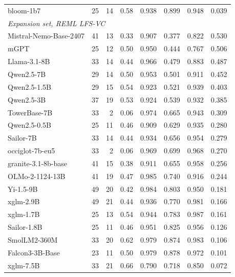 \documentclass{article} %
\begin{document}
\begin{table}[h]
\begin{center}
\begin{tabular}{lrrrrrrr}
bloom-1b7 & 25 & 14 & 0.58 & 0.938 & 0.899 & 0.948 & 0.039 \\
\multicolumn{8}{l}{\emph{Expansion set, REML LFS-VC}} \\
Mistral-Nemo-Base-2407 & 41 & 13 & 0.33 & 0.907 & 0.377 & 0.822 & 0.530 \\
mGPT & 25 & 12 & 0.50 & 0.950 & 0.444 & 0.767 & 0.506 \\
Llama-3.1-8B & 33 & 14 & 0.44 & 0.966 & 0.479 & 0.883 & 0.487 \\
Qwen2.5-7B & 29 & 14 & 0.50 & 0.953 & 0.501 & 0.911 & 0.452 \\
Qwen2.5-1.5B & 29 & 15 & 0.54 & 0.923 & 0.521 & 0.939 & 0.403 \\
Qwen2.5-3B & 37 & 19 & 0.53 & 0.924 & 0.539 & 0.932 & 0.385 \\
TowerBase-7B & 33 & 2 & 0.06 & 0.974 & 0.665 & 0.943 & 0.309 \\
Qwen2.5-0.5B & 25 & 11 & 0.46 & 0.909 & 0.629 & 0.935 & 0.280 \\
Sailor-7B & 33 & 14 & 0.44 & 0.934 & 0.656 & 0.954 & 0.279 \\
occiglot-7b-eu5 & 33 & 2 & 0.06 & 0.969 & 0.699 & 0.968 & 0.270 \\
granite-3.1-8b-base & 41 & 15 & 0.38 & 0.911 & 0.655 & 0.958 & 0.256 \\
OLMo-2-1124-13B & 41 & 19 & 0.47 & 0.985 & 0.740 & 0.916 & 0.244 \\
Yi-1.5-9B & 49 & 20 & 0.42 & 0.984 & 0.803 & 0.950 & 0.181 \\
xglm-2.9B & 49 & 21 & 0.44 & 0.936 & 0.770 & 0.981 & 0.166 \\
xglm-1.7B & 25 & 13 & 0.54 & 0.944 & 0.783 & 0.987 & 0.161 \\
Sailor-1.8B & 25 & 11 & 0.46 & 0.951 & 0.825 & 0.956 & 0.126 \\
SmolLM2-360M & 33 & 20 & 0.62 & 0.979 & 0.874 & 0.983 & 0.106 \\
Falcon3-3B-Base & 23 & 11 & 0.50 & 0.979 & 0.878 & 0.972 & 0.101 \\
xglm-7.5B & 33 & 21 & 0.66 & 0.790 & 0.718 & 0.850 & 0.072 \\
\bottomrule
\end{tabular}
\end{center}

\end{table}
\end{document}
